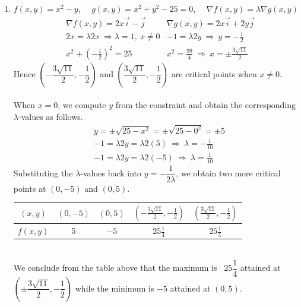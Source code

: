 \documentclass[12pt]{amsart}
\begin{document}
\begin{enumerate}
	\item $f(x,y)=x^2-y$, \ \ $ g(x,y)=x^2+y^2-25=0$, \ \ $\nabla f(x,y)= \lambda \nabla g(x,y)$
		\begin{align*}
			\ &\nabla f(x,y)=2x\vec{i}-\vec{j} &\nabla g(x,y)=2x\vec{i}+2y\vec{j}\\
			&2x=\lambda 2x \ \Rightarrow \lambda=1,  \ x\ne0 &-1=\lambda 2y \ \Rightarrow \ y=-\frac{1}{2} \\
			&x^2+\left(-\frac{1}{2}\right)^2=25 &x^2=\frac{99}{4} \ \Rightarrow \ x=\pm \frac{3\sqrt{11}}{2}
		\end{align*}
		Hence $\left(-\dfrac{3\sqrt{11}}{2},-\dfrac{1}{2}\right)$ and $\left(\dfrac{3\sqrt{11}}{2},-\dfrac{1}{2}\right)$ are critical points when $x\ne0$. \\
		\\
		When $x=0$, we compute $y$ from the constraint and obtain the corresponding $\lambda$-values as follows.
			\begin{align*}
				&y=\pm\sqrt{25-x^2}=\pm\sqrt{25-0^2}=\pm 5 \\
				&-1=\lambda 2y=\lambda 2(5) \ \Rightarrow \ \lambda=-\frac{1}{10} \\
				&-1=\lambda 2y=\lambda 2(-5) \ \Rightarrow \ \lambda=\frac{1}{10}
			\end{align*}
		Substituting the $\lambda$-values back into $y=-\dfrac{1}{2\lambda}$, we obtain two more critical points at $(0,-5)$ and $(0,5)$. \\
		\begin{table}[!ht]
			\begin{center}
				\begin{tabular}{|c||c|c|c|c|}
					\hline
					$(x,y)$ &$(0,-5)$ &$(0,5)$ &$(-\frac{3\sqrt{11}}{2},-\frac{1}{2})$ &$(\frac{3\sqrt{11}}{2},-\frac{1}{2})$ \\
					\hline
					$f(x,y)$ &5 &$-5$ &$25 \frac{1}{4}$ &$25 \frac{1}{4}$ \\
					\hline
				\end{tabular}
			\end{center}
		\end{table} 
		\\
		We conclude from the table above that the maximum is \ $25 \dfrac{1}{4}$ attained at $\left(\pm\dfrac{3\sqrt{11}}{2},-\dfrac{1}{2}\right)$ while the minimum is $-5$ attained at $(0,5)$.\\
		
		\medskip
		

\end{enumerate}
\end{document}
